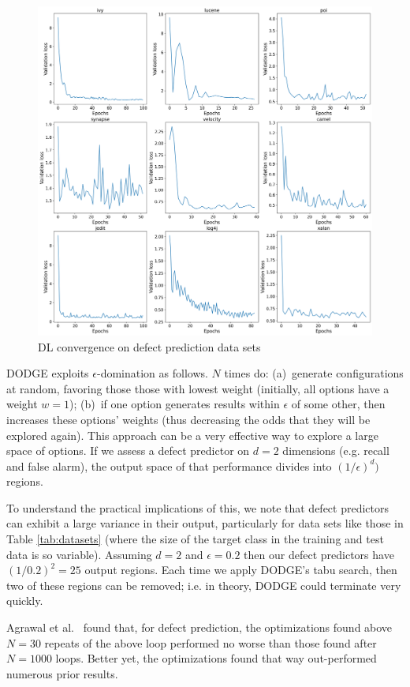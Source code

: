 \documentclass[10pt,compsoc,twocolumn]{IEEEtran}
\begin{document}
 

\begin{figure}
    \includegraphics[width=.49\textwidth]{convergence.png}
    \caption{DL convergence on defect prediction data sets}
    \label{fig:convergence}
\end{figure}
DODGE  exploits   $\epsilon$-domination as follows. $N$ times do: (a)~generate configurations   at random, favoring those those with lowest weight (initially, all options have a weight $w=1$); (b)~if one option generates results within $\epsilon$ of some other, then   increases these options' weights (thus  decreasing the odds that they will be explored again).
This approach can be a very effective way to explore a large space 
of options.
If we assess a defect predictor  on $d=2$
dimensions (e.g. recall and false alarm), the output space of that performance divides into $(1/\epsilon)^d)$ regions.

To understand the practical implications of this,
we note that
defect predictors can exhibit a large variance
in their output, particularly for data sets like
those in Table \ref{tab:datasets} (where the size of the target class in the training and test
data  is so variable).
 Assuming  $d=2$ and $\epsilon=0.2$ then 
 our defect predictors have
$(1/0.2)^2=25$ output regions. 
Each time we apply
DODGE's tabu search, then two of these regions can  be removed; i.e. in theory, DODGE could terminate very quickly.

Agrawal et al.~\cite{agrawal2019dodge}  found that, for defect prediction,
 the optimizations found above $N=30$ repeats of
the above loop performed no worse than those found after $N=1000$ loops. Better yet, the optimizations found that way
out-performed numerous prior results.




\end{document}
